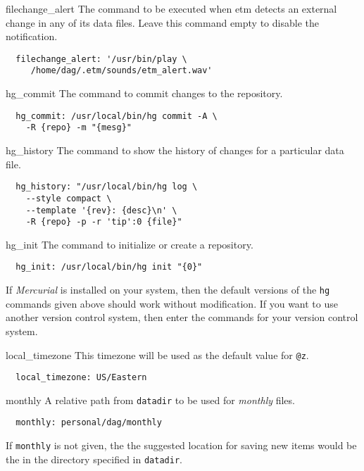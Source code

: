 \documentclass[9pt,landscape]{article}
\begin{document}
\begin{multicols}{3}
\begin{compactdesc}
\item[filechange\_alert] The command to be executed when etm detects an external change in any of its data files. Leave this command empty to disable the notification.
\begin{verbatim}
  filechange_alert: '/usr/bin/play \
     /home/dag/.etm/sounds/etm_alert.wav'
\end{verbatim}

\item[hg\_commit] The command to commit changes to the repository.
\begin{verbatim}
  hg_commit: /usr/local/bin/hg commit -A \
    -R {repo} -m "{mesg}"
\end{verbatim}

\item[hg\_history] The command to show the history of changes for a particular data file.
\begin{verbatim}
  hg_history: "/usr/local/bin/hg log \
    --style compact \
    --template '{rev}: {desc}\n' \
    -R {repo} -p -r 'tip':0 {file}"
\end{verbatim}

\item[hg\_init] The command to initialize or create a repository.
\begin{verbatim}
  hg_init: /usr/local/bin/hg init "{0}"
\end{verbatim}

\end{compactdesc}

If \emph{Mercurial} is installed on your system, then the default versions of the \verb'hg' commands given above should work without modification. If you want to use another version control system, then enter the commands for your version control system.

\begin{compactdesc}
\vskip3pt

\item[local\_timezone] This timezone will be used as the default value for \verb'@z'.
\begin{verbatim}
  local_timezone: US/Eastern
\end{verbatim}

\item[monthly] A relative path from \verb'datadir' to be used for \emph{monthly} files.
\begin{verbatim}
  monthly: personal/dag/monthly
\end{verbatim}
If \verb'monthly' is not given, the the suggested location for saving new items would be the in the directory specified in \verb'datadir'.


\end{compactdesc}
\end{multicols}
\end{document}
